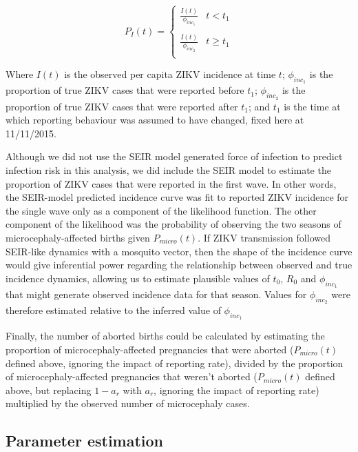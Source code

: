 \documentclass[10pt,letterpaper]{article}
\begin{document}
\begin{equation}
P_I(t) = \left\{\begin{array}{lr}
\frac{I(t)}{\phi_{inc_1}} & t < t_1\\\\
\frac{I(t)}{\phi_{inc_2}} & t \geq t_1\\
\end{array}
\right.
\end{equation}

Where \(I(t)\) is the observed per capita ZIKV incidence at time \(t\);
\(\phi_{inc_1}\) is the proportion of true ZIKV cases that were reported
before \(t_1\); \(\phi_{inc_2}\) is the proportion of true ZIKV cases
that were reported after \(t_1\); and \(t_1\) is the time at which
reporting behaviour was assumed to have changed, fixed here at
11/11/2015.

Although we did not use the SEIR model generated force of infection to
predict infection risk in this analysis, we did include the SEIR model
to estimate the proportion of ZIKV cases that were reported in the first
wave. In other words, the SEIR-model predicted incidence curve was fit
to reported ZIKV incidence for the single wave only as a component of
the likelihood function. The other component of the likelihood was the
probability of observing the two seasons of microcephaly-affected births
given \(P_{micro}(t)\). If ZIKV transmission followed SEIR-like dynamics
with a mosquito vector, then the shape of the incidence curve would give
inferential power regarding the relationship between observed and true
incidence dynamics, allowing us to estimate plausible values of \(t_0\),
\(R_0\) and \(\phi_{inc_1}\) that might generate observed incidence data
for that season. Values for \(\phi_{inc_2}\) were therefore estimated
relative to the inferred value of \(\phi_{inc_1}\)

Finally, the number of aborted births could be calculated by estimating
the proportion of microcephaly-affected pregnancies that were aborted
(\(P_{micro}(t)\) defined above, ignoring the impact of reporting rate),
divided by the proportion of microcephaly-affected pregnancies that
weren't aborted (\(P_{micro}(t)\) defined above, but replacing \(1-a_r\)
with \(a_r\), ignoring the impact of reporting rate) multiplied by the
observed number of microcephaly cases.

\subsection{Parameter estimation}\label{parameter-estimation}
\end{document}
